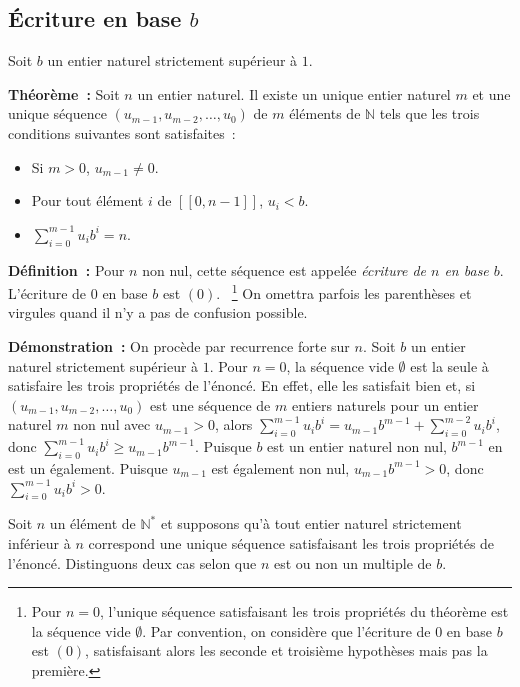 \subsection{Écriture en base \texorpdfstring{$b$}{b}}
\label{sub:base}

Soit $b$ un entier naturel strictement supérieur à $1$. 

\bigskip 

\noindent\textbf{Théorème :} Soit $n$ un entier naturel. 
    Il existe un unique entier naturel $m$ et une unique séquence $(u_{m-1}, u_{m-2}, \dots, u_0)$ de $m$ éléments de $\mathbb{N}$ tels que les trois conditions suivantes sont satisfaites : 
    \begin{itemize}[nosep]
        \item Si $m > 0$, $u_{m-1} \neq 0$.
        \item Pour tout élément $i$ de $[\![0,n-1]\!]$, $u_i < b$.
        \item $\sum_{i=0}^{m-1} u_i b^{i} = n$.
    \end{itemize}

\medskip 

\noindent\textbf{Définition :} Pour $n$ non nul, cette séquence est appelée \textit{écriture de $n$ en base $b$}. 
    L'écriture de $0$ en base $b$ est $(0)$.%
    ~\footnote{Pour $n=0$, l'unique séquence satisfaisant les trois propriétés du théorème est la séquence vide $\emptyset$. Par convention, on considère que l'écriture de $0$ en base $b$ est $(0)$, satisfaisant alors les seconde et troisième hypothèses mais pas la première.}
    On omettra parfois les parenthèses et virgules quand il n'y a pas de confusion possible. 

\medskip

\noindent\textbf{Démonstration :} 
On procède par recurrence forte sur $n$. 
Soit $b$ un entier naturel strictement supérieur à $1$. 
Pour $n = 0$, la séquence vide $\emptyset$ est la seule à satisfaire les trois propriétés de l'énoncé. 
En effet, elle les satisfait bien et, si $(u_{m-1}, u_{m-2}, \dots, u_0)$ est une séquence de $m$ entiers naturels pour un entier naturel $m$ non nul avec $u_{m-1} > 0$, alors $\sum_{i=0}^{m-1} u_i b^{i} = u_{m-1} b^{m-1} + \sum_{i=0}^{m-2} u_i b^{i}$, donc $\sum_{i=0}^{m-1} u_i b^{i} \geq u_{m-1} b^{m-1}$. 
Puisque $b$ est un entier naturel non nul, $b^{m-1}$ en est un également.
Puisque $u_{m-1}$ est également non nul, $u_{m-1} b^{m-1} > 0$, donc $\sum_{i=0}^{m-1} u_i b^{i} > 0$.

Soit $n$ un élément de $\mathbb{N}^*$ et supposons qu'à tout entier naturel strictement inférieur à $n$ correspond une unique séquence satisfaisant les trois propriétés de l'énoncé. 
Distinguons deux cas selon que $n$ est ou non un multiple de $b$. 

